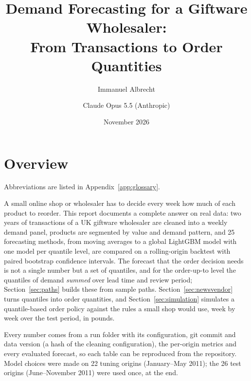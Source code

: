 \documentclass[11pt,a4paper]{article}
\title{Demand Forecasting for a Giftware Wholesaler:\\From Transactions to Order
  Quantities}
\author{Immanuel Albrecht \and Claude Opus 5.5 (Anthropic)}
\date{November 2026}
\begin{document}
\maketitle


\section{Overview}
\label{sec:overview}

Abbreviations are listed in Appendix~\ref{app:glossary}.

A small online shop or wholesaler has to decide every week how much of each product to
reorder. This report documents a complete answer on real data: two years of
transactions of a UK giftware wholesaler are cleaned into a weekly demand panel, products are
segmented by value and demand pattern, and 25 forecasting methods, from moving averages to a
global LightGBM model with one model per quantile level, are compared on a rolling-origin
backtest with paired bootstrap confidence intervals. The forecast that the order decision
needs is not a single number but a set of quantiles, and for the order-up-to level the
quantiles of demand \emph{summed} over lead time and review period; Section~\ref{sec:paths}
builds these from sample paths. Section~\ref{sec:newsvendor} turns quantiles into order
quantities, and Section~\ref{sec:simulation} simulates a quantile-based order policy against
the rules a small shop would use, week by week over the test period, in pounds.

Every number comes from a run folder with its configuration, git commit and data version (a
hash of the cleaning configuration), the per-origin metrics and every evaluated forecast, so
each table can be reproduced from the repository. Model choices were made on 22 tuning origins
(January--May 2011); the 26 test origins (June--November 2011) were used once, at the end.
\end{document}
